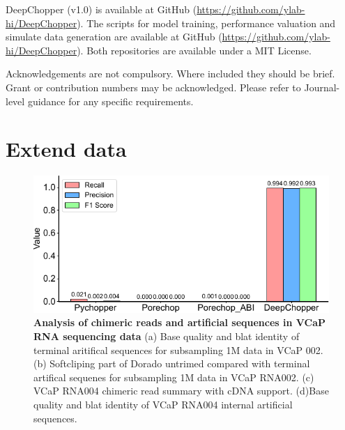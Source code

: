 \documentclass[pdflatex, sn-mathphys-num, lineno]{sn-jnl}%
\theoremstyle{thmstyleone}%
\theoremstyle{thmstyletwo}%
\theoremstyle{thmstylethree}%
\begin{document}

DeepChopper (v1.0) is available at GitHub (\url{https://github.com/ylab-hi/DeepChopper}).
The scripts for model training, performance valuation and simulate data generation are available at GitHub (\url{https://github.com/ylab-hi/DeepChopper}).
Both repositories are available under a MIT License.


Acknowledgements are not compulsory. Where included they should be brief. Grant or contribution numbers may be acknowledged.
Please refer to Journal-level guidance for any specific requirements.


\backmatter

\begin{appendices}
    \printglossary[type=\acronymtype, title=Abbreviations]

\end{appendices}






\newpage

\section{Extend data}

\renewcommand{\figurename}{Extended Data Fig.}


 \begin{figure}[!h]
     \includegraphics[height=0.65\columnwidth]{figures/finals/sf1}
     \caption{ {\bf Analysis of chimeric reads and artificial sequences in VCaP RNA sequencing data } (a) Base quality and \gls{blat} identity of terminal aritifical sequences for subsampling 1M data in VCaP 002. (b) Softcliping part of Dorado untrimed compared with terminal artifical sequenes for subsampling 1M data in VCaP RNA002. (c) VCaP RNA004 chimeric read summary with cDNA support. (d)Base quality and \gls{blat} identity of VCaP RNA004 internal artificial sequences.}
     \label{fig:sf1}
 \end{figure}
\end{document}
